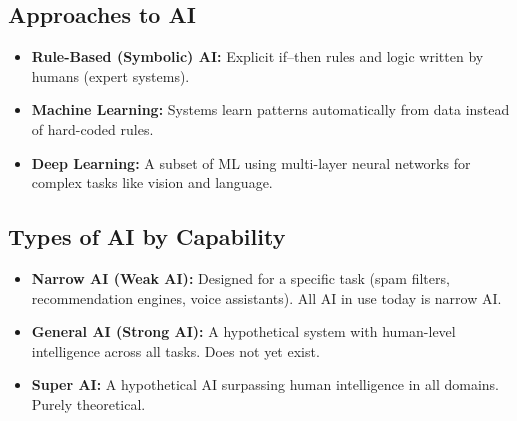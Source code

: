 \documentclass[11pt,a4paper]{article}
\begin{document}
\subsection{Approaches to AI}
\begin{center}
\end{center}
\begin{itemize}[leftmargin=*]
  \item \textbf{Rule-Based (Symbolic) AI:} Explicit if--then rules and logic written by humans (expert systems).
  \item \textbf{Machine Learning:} Systems learn patterns automatically from data instead of hard-coded rules.
  \item \textbf{Deep Learning:} A subset of ML using multi-layer neural networks for complex tasks like vision and language.
\end{itemize}

\subsection{Types of AI by Capability}
\begin{itemize}[leftmargin=*]
  \item \textbf{Narrow AI (Weak AI):} Designed for a specific task (spam filters, recommendation engines, voice assistants). All AI in use today is narrow AI.
  \item \textbf{General AI (Strong AI):} A hypothetical system with human-level intelligence across all tasks. Does not yet exist.
  \item \textbf{Super AI:} A hypothetical AI surpassing human intelligence in all domains. Purely theoretical.
\end{itemize}
\end{document}

